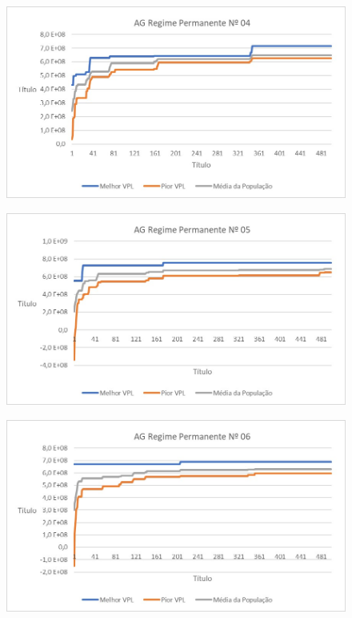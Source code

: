 \documentclass[12pt,a4paper]{report}
\begin{document}
\begin{figure}[H]
\centering

\includegraphics[scale=1]{ApB/AGRP/4}

\end{figure}

\begin{figure}[H]
\centering

\includegraphics[scale=1]{ApB/AGRP/5}

\end{figure}

\begin{figure}[H]
\centering

\includegraphics[scale=1]{ApB/AGRP/6}

\end{figure}
\end{document}
